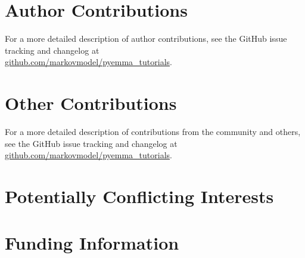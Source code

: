 \documentclass[9pt,tutorial,lineno,onehalfspacing]{livecoms}
\newcommand{\githubrepository}{\url{github.com/markovmodel/pyemma_tutorials}}
\begin{document}
\section{Author Contributions}
%
For a more detailed description of author contributions, see the GitHub issue tracking and changelog at\\\githubrepository{}.

\section{Other Contributions}
%
For a more detailed description of contributions from the community and others, see the GitHub issue tracking and changelog at \githubrepository{}.

\section{Potentially Conflicting Interests}

\section{Funding Information}




\end{document}
